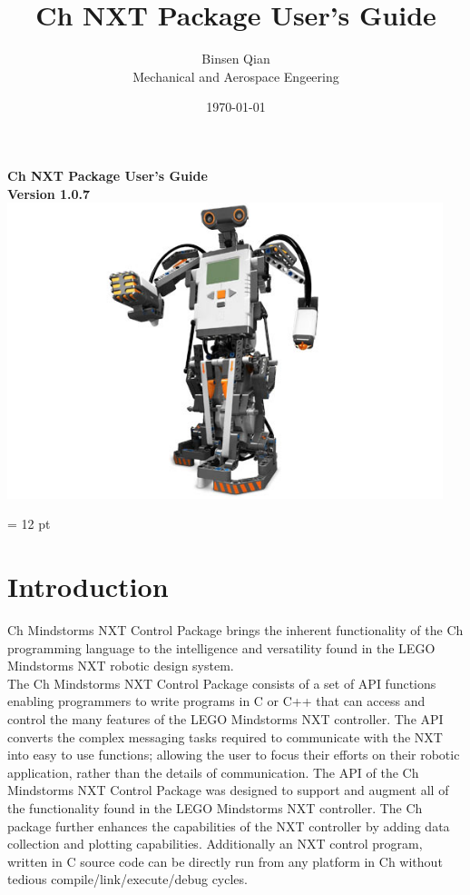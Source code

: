 \documentclass[11pt]{article}
\title{Ch NXT Package User's Guide}
\author{Binsen Qian\\Mechanical and Aerospace Engeering}
\date{\today}
\begin{document}
\begin{titlepage}
\begin{center}
\vspace*{2cm}
{\Huge\sf\bf Ch NXT Package User's Guide}\\
\vspace*{2cm}
{\bf Version 1.0.7}\\
\vspace*{4cm}
\includegraphics[width = 5in]{figure/mindstorm/NXT_humanoid.png}
\end{center}
\end{titlepage}

\newpage
{}
\tableofcontents
\newpage

\baselineskip = 12 pt

\section{Introduction}
Ch Mindstorms NXT Control Package brings the inherent functionality of the Ch programming language
to the intelligence and versatility found in the LEGO Mindstorms NXT robotic design system.\\

The Ch Mindstorms NXT Control Package consists of a set of API functions enabling programmers to 
write programs in C or C++ that can access and control the many features of the LEGO Mindstorms 
NXT controller. The API converts the complex messaging tasks required to communicate with the NXT 
into easy to use functions; allowing the user  to focus their efforts on their robotic application, 
rather than the details of communication. The API of the Ch Mindstorms NXT Control Package was 
designed to support and augment all of the functionality found in the LEGO Mindstorms NXT controller.
The Ch package further enhances the capabilities of the NXT controller by adding data collection and 
plotting capabilities. Additionally an NXT control program, written in C source code can be directly 
run from any platform in Ch without tedious compile/link/execute/debug cycles.\\
\end{document}
